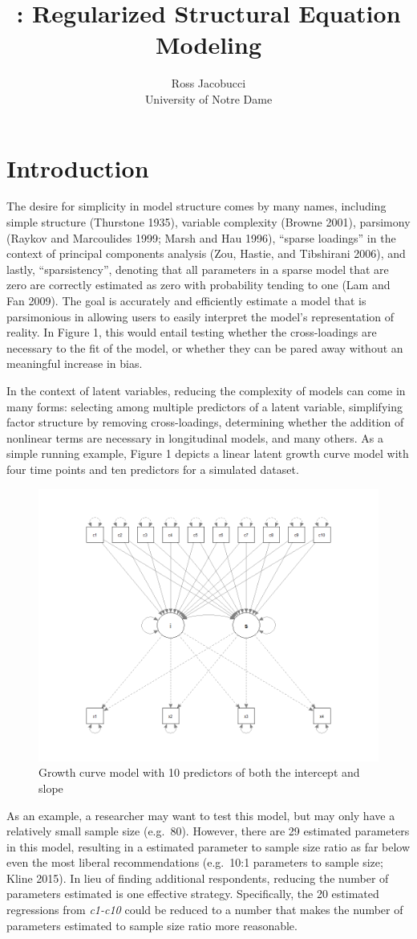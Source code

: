 \documentclass[article]{jss}
\author{
Ross Jacobucci\\University of Notre Dame
}
\title{\pkg{regsem}: Regularized Structural Equation Modeling}
\begin{document}
\setlength\parindent{24pt} \setlength{\parskip}{0.5em}

\section{Introduction}\label{introduction}

The desire for simplicity in model structure comes by many names,
including simple structure (Thurstone 1935), variable complexity (Browne
2001), parsimony (Raykov and Marcoulides 1999; Marsh and Hau 1996),
``sparse loadings'' in the context of principal components analysis
(Zou, Hastie, and Tibshirani 2006), and lastly, ``sparsistency'',
denoting that all parameters in a sparse model that are zero are
correctly estimated as zero with probability tending to one (Lam and Fan
2009). The goal is accurately and efficiently estimate a model that is
parsimonious in allowing users to easily interpret the model's
representation of reality. In Figure 1, this would entail testing
whether the cross-loadings are necessary to the fit of the model, or
whether they can be pared away without an meaningful increase in bias.

In the context of latent variables, reducing the complexity of models
can come in many forms: selecting among multiple predictors of a latent
variable, simplifying factor structure by removing cross-loadings,
determining whether the addition of nonlinear terms are necessary in
longitudinal models, and many others. As a simple running example,
Figure 1 depicts a linear latent growth curve model with four time
points and ten predictors for a simulated dataset.

\begin{figure}
    \centering
    \includegraphics[width=.5\linewidth]{figs/growth_fig}
    \caption{Growth curve model with 10 predictors of both the intercept and slope}
\end{figure}

As an example, a researcher may want to test this model, but may only
have a relatively small sample size (e.g.~80). However, there are 29
estimated parameters in this model, resulting in a estimated parameter
to sample size ratio as far below even the most liberal recommendations
(e.g.~10:1 parameters to sample size; Kline 2015). In lieu of finding
additional respondents, reducing the number of parameters estimated is
one effective strategy. Specifically, the 20 estimated regressions from
\textit{c1-c10} could be reduced to a number that makes the number of
parameters estimated to sample size ratio more reasonable.
\end{document}
